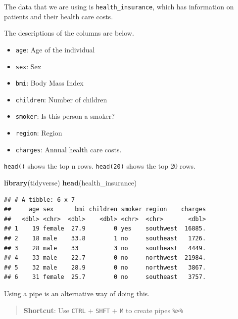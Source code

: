 \documentclass[openany]{book}
\newenvironment{Shaded}{\begin{snugshade}}{\end{snugshade}}
\newcommand{\KeywordTok}[1]{\textcolor[rgb]{0.13,0.29,0.53}{\textbf{#1}}}
\newcommand{\NormalTok}[1]{#1}
\newcommand{\OperatorTok}[1]{\textcolor[rgb]{0.81,0.36,0.00}{\textbf{#1}}}
\newcommand{\StringTok}[1]{\textcolor[rgb]{0.31,0.60,0.02}{#1}}
\providecommand{\tightlist}{%
  \setlength{\itemsep}{0pt}\setlength{\parskip}{0pt}}
\begin{document}
The data that we are using is \texttt{health\_insurance}, which has information on patients and their health care costs.

The descriptions of the columns are below.

\begin{itemize}
\tightlist
\item
  \texttt{age}: Age of the individual
\item
  \texttt{sex}: Sex
\item
  \texttt{bmi}: Body Mass Index
\item
  \texttt{children}: Number of children
\item
  \texttt{smoker}: Is this person a smoker?
\item
  \texttt{region}: Region
\item
  \texttt{charges}: Annual health care costs.
\end{itemize}

\texttt{head()} shows the top n rows. \texttt{head(20)} shows the top 20 rows.

\begin{Shaded}
\begin{Highlighting}[]
\KeywordTok{library}\NormalTok{(tidyverse)}
\KeywordTok{head}\NormalTok{(health_insurance)}
\end{Highlighting}
\end{Shaded}

\begin{verbatim}
## # A tibble: 6 x 7
##     age sex      bmi children smoker region    charges
##   <dbl> <chr>  <dbl>    <dbl> <chr>  <chr>       <dbl>
## 1    19 female  27.9        0 yes    southwest  16885.
## 2    18 male    33.8        1 no     southeast   1726.
## 3    28 male    33          3 no     southeast   4449.
## 4    33 male    22.7        0 no     northwest  21984.
## 5    32 male    28.9        0 no     northwest   3867.
## 6    31 female  25.7        0 no     southeast   3757.
\end{verbatim}

Using a pipe is an alternative way of doing this.

\begin{Shaded}
\end{Shaded}

\begin{quote}
\textbf{Shortcut}: Use \texttt{CTRL} + \texttt{SHFT} + \texttt{M} to create pipes \texttt{\%\textgreater{}\%}
\end{quote}
\end{document}
